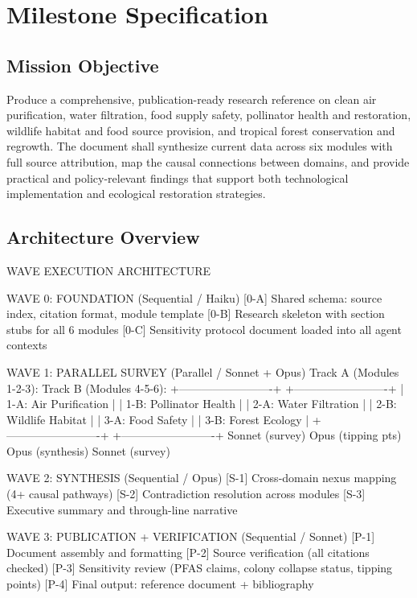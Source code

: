 \documentclass[11pt,letterpaper]{article}
\newcommand{\stageheader}[2]{%
  \noindent\colorbox{#2}{\makebox[\textwidth][l]{%
    \textcolor{white}{\bfseries\sffamily\hspace{6pt}#1\hspace{6pt}}}}%
  \vspace{0.5em}\par%
}
\begin{document}
\newpage
\stageheader{STAGE 3 --- MISSION PACKAGE}{tertiary}

\section{Milestone Specification}

\subsection{Mission Objective}

Produce a comprehensive, publication-ready research reference on clean air purification, water filtration, food supply safety, pollinator health and restoration, wildlife habitat and food source provision, and tropical forest conservation and regrowth. The document shall synthesize current data across six modules with full source attribution, map the causal connections between domains, and provide practical and policy-relevant findings that support both technological implementation and ecological restoration strategies.

\subsection{Architecture Overview}

\begin{asciibox}
WAVE EXECUTION ARCHITECTURE

WAVE 0: FOUNDATION (Sequential / Haiku)
  [0-A] Shared schema: source index, citation format, module template
  [0-B] Research skeleton with section stubs for all 6 modules
  [0-C] Sensitivity protocol document loaded into all agent contexts

WAVE 1: PARALLEL SURVEY (Parallel / Sonnet + Opus)
  Track A (Modules 1-2-3):          Track B (Modules 4-5-6):
  +-------------------------+        +-------------------------+
  | 1-A: Air Purification   |        | 1-B: Pollinator Health  |
  | 2-A: Water Filtration   |        | 2-B: Wildlife Habitat   |
  | 3-A: Food Safety        |        | 3-B: Forest Ecology     |
  +-------------------------+        +-------------------------+
      Sonnet (survey)                     Opus (tipping pts)
      Opus (synthesis)                    Sonnet (survey)

WAVE 2: SYNTHESIS (Sequential / Opus)
  [S-1] Cross-domain nexus mapping (4+ causal pathways)
  [S-2] Contradiction resolution across modules
  [S-3] Executive summary and through-line narrative

WAVE 3: PUBLICATION + VERIFICATION (Sequential / Sonnet)
  [P-1] Document assembly and formatting
  [P-2] Source verification (all citations checked)
  [P-3] Sensitivity review (PFAS claims, colony collapse status, tipping points)
  [P-4] Final output: reference document + bibliography
\end{asciibox}
\end{document}
